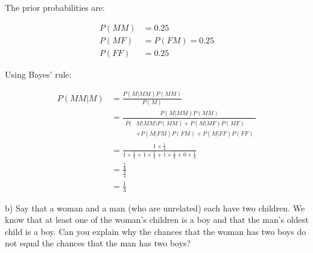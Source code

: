 \documentclass[
  letterpaper,
  DIV=11,
  numbers=noendperiod]{scrreprt}
\begin{document}
\begin{tcolorbox}[enhanced jigsaw, title=\textcolor{quarto-callout-tip-color}{\faLightbulb}\hspace{0.5em}{Answer}, toprule=.15mm, colback=white, breakable, titlerule=0mm, colframe=quarto-callout-tip-color-frame, coltitle=black, opacityback=0, rightrule=.15mm, colbacktitle=quarto-callout-tip-color!10!white, bottomtitle=1mm, opacitybacktitle=0.6, arc=.35mm, bottomrule=.15mm, toptitle=1mm, leftrule=.75mm, left=2mm]

The prior probabilities are:

\begin{align*}
P(MM)&=0.25 \\
P(MF)&=P(FM)=0.25 \\
P(FF)&=0.25
\end{align*}

Using Bayes' rule:

\begin{align*}
P(MM|M)&=\frac{P(M|MM)P(MM)}{P(M)} \\[6pt]
&=\frac{P(M|MM)P(MM)}{\begin{aligned}P(&M|MM)P(MM)+P(M|MF)P(MF)\\&+P(M|FM)P(FM)+P(M|FF)P(FF)\end{aligned}} \\[6pt]
&=\frac{1\times\frac{1}{4}}{1\times\frac{1}{4}+1\times\frac{1}{4}+1\times\frac{1}{4}+0\times\frac{1}{4}} \\[6pt]
&=\frac{\frac{1}{4}}{\frac{3}{4}} \\[6pt]
&=\frac{1}{3}
\end{align*}

\end{tcolorbox}

b) Say that a woman and a man (who are unrelated) each have two
children. We know that at least one of the woman's children is a boy and
that the man's oldest child is a boy. Can you explain why the chances
that the woman has two boys do not equal the chances that the man has
two boys?
\end{document}
